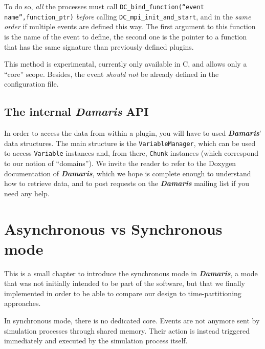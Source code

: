 \documentclass[11pt]{report}
\newcommand{\Damaris}{\emph{\textbf{Damaris}}}
\begin{document}
To do so, \emph{all} the processes must call \texttt{DC\_bind\_function(``event name'',function\_ptr)} \emph{before}
calling \texttt{DC\_mpi\_init\_and\_start}, and in the \emph{same order} if multiple events are defined this way. 
The first argument to this function is the name of the event to define,
the second one is the pointer to a function that has the same signature than previously defined plugins.

This method is experimental, currently only available in C, and allows only a ``core'' scope. 
Besides, the event \emph{should not} be already defined in the configuration file.

\section{The internal \Damaris{} API}\label{sec:internalAPI}

In order to access the data from within a plugin, you will have to used \Damaris{}' data structures.
The main structure is the \texttt{VariableManager}, which can be used to access \texttt{Variable} instances
and, from there, \texttt{Chunk} instances (which correspond to our notion of ``domains''). 
We invite the reader to refer to the Doxygen documentation of
\Damaris{}, which we hope is complete enough to understand how to retrieve data,
and to post requests on the \Damaris{} mailing list if you need any help.


\chapter{Asynchronous vs Synchronous mode}

This is a small chapter to introduce the synchronous mode in \Damaris{}, a mode that was not initially
intended to be part of the software, but that we finally implemented in order to be able to compare
our design to time-partitioning approaches.

In synchronous mode, there is no dedicated core. Events are not anymore sent by simulation processes
through shared memory. Their action is instead triggered immediately and executed by the simulation
process itself.
\end{document}
